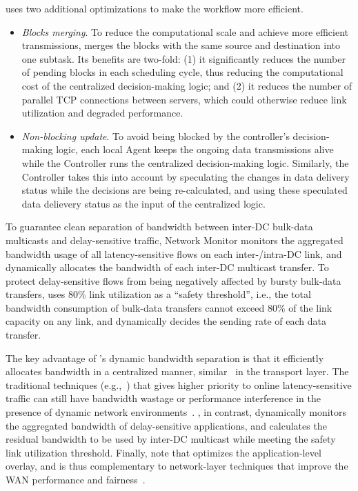 \name uses two additional optimizations to make the workflow
more efficient.
\begin{itemize}
\item \emph{Blocks merging}.
To reduce the computational scale and achieve more efficient
transmissions, \name merges the blocks with the same source and
destination into one subtask. Its benefits are two-fold: (1) it
significantly reduces the number of pending blocks in each
scheduling cycle, thus reducing the computational cost of the
centralized decision-making logic; and (2) it reduces the number
of parallel TCP connections between servers, which could
otherwise reduce link utilization and degraded performance.
\item \emph{Non-blocking update}.
To avoid being blocked by the controller's decision-making logic,
each local Agent  keeps the ongoing data transmissions alive while
the Controller runs the centralized decision-making logic.
Similarly, the Controller takes this into account by speculating
the changes in data delivery status while the decisions are being
re-calculated, and using these speculated data delievery status as
the input of the centralized logic.
\end{itemize}

\label{subsec:system:separation}

To guarantee clean separation of bandwidth between inter-DC
bulk-data multicasts and delay-sensitive traffic, \name Network
Monitor monitors the aggregated bandwidth usage of all
latency-sensitive flows on each inter-/intra-DC link, and
dynamically allocates the bandwidth of each inter-DC multicast
transfer. To protect delay-sensitive flows from being negatively
affected by bursty bulk-data transfers, \name uses 80\% link
utilization as a ``safety threshold'', i.e., the total bandwidth
consumption of bulk-data transfers cannot exceed 80\% of the link
capacity on any link, and dynamically decides the sending rate
of each data transfer.

The key advantage of \name's dynamic bandwidth separation is that it
efficiently allocates bandwidth in a centralized manner,
similar~\cite{kumar2015bwe} in the transport layer. The traditional
techniques (e.g.,~\cite{kumar2015bwe}) that gives higher priority to
online latency-sensitive traffic can still have bandwidth wastage or
performance interference in the presence of dynamic network
environments~\cite{wang2017toward}. \name, in contrast, dynamically monitors the aggregated
bandwidth of delay-sensitive applications, and calculates the
residual bandwidth to be used by inter-DC multicast while meeting the
safety link utilization threshold. Finally, note that \name optimizes
the application-level overlay, and is thus complementary to
network-layer techniques that improve the WAN performance and
fairness~\cite{chen2012design, kavulya2010analysis, mishra2010towards, reiss2012heterogeneity}.


